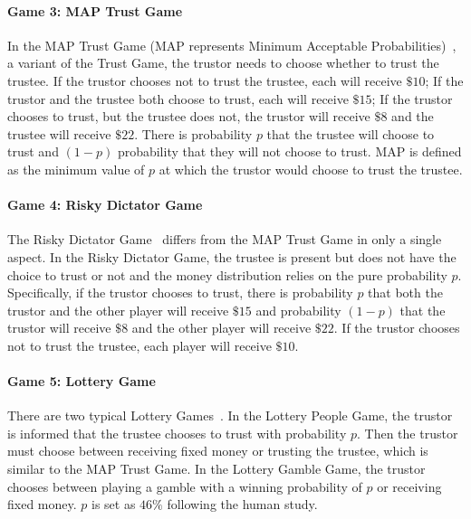 \vspace{-3mm}
\paragraph{Game 3: MAP Trust Game}
\label{game:MAP Problem}
In the MAP Trust Game (MAP represents Minimum Acceptable Probabilities)~\citep{BOHNET2004467}, a variant of the Trust Game,
the trustor needs to choose whether to trust the trustee. If the trustor chooses not to trust the trustee, each will receive $\$10$; If the trustor and the trustee both choose to trust, each will receive $\$15$; If the trustor chooses to trust, but the trustee does not, the trustor will receive $\$8$ and the trustee will receive $\$22$. There is probability $p$ that the trustee will choose to trust and $(1-p)$ probability that they will not choose to trust. MAP is defined as the minimum value of \( p \)  at which the trustor would choose to trust the trustee.




\vspace{-3mm}

\paragraph{Game 4: Risky Dictator Game} 
The Risky Dictator Game~\citep{BOHNET2004467} differs from the MAP Trust Game in only a single aspect. In the Risky Dictator Game,  the trustee is present but does not have the choice to trust or not and the money distribution relies on the pure probability $p$. Specifically, if the trustor chooses to trust, there is probability $p$ that both the trustor and the other player will receive $\$15$ and probability $(1-p)$ that the trustor will receive $\$8$ and the other player will receive $\$22$. If the trustor chooses not to trust the trustee, each player will receive $\$10$.







\vspace{-3mm}
\paragraph{Game 5: Lottery Game}
\label{game:Lottery Problem}
There are two typical Lottery Games~\citep{fetchenhauerBetrayalAversionPrincipled2012}. In the Lottery People Game, the trustor is informed that the trustee chooses to trust with probability \( p \). Then the trustor must choose between receiving fixed money or trusting the trustee, which is similar to the MAP Trust Game. In the Lottery Gamble Game, the trustor chooses between playing a gamble with a winning probability of \( p \) or receiving fixed money. \( p \) is set as \( 46\%\) following the human study.

